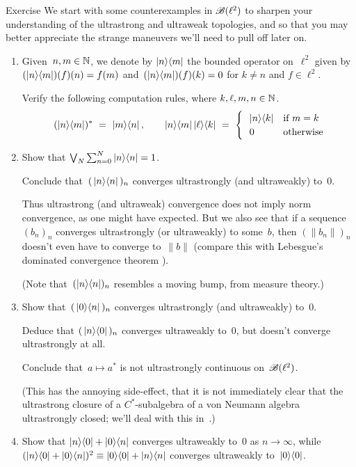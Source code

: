 \documentclass[a]{subfiles}
\begin{document}
\begin{parsec}%
\begin{point}{Exercise}%
We start with some counterexamples in $\mathscr{B}(\ell^2)$
to sharpen your understanding of the ultrastrong and ultraweak topologies,
and so that you may better appreciate
the strange maneuvers we'll need to pull off later on.
\begin{enumerate}
\item
Given~$n,m\in \mathbb{N}$,
we denote by $\left|n\right>\!\left<m\right|$
the bounded operator on~$\ell^2$
given by $(\left|n\right>\!\left<m\right|)(f)(n)=f(m)$
and~$(\left|n\right>\!\left<m\right|)(f)(k)=0$ for $k\neq n$
and $f\in \ell^2$.

Verify the following computation rules,
where $k,\ell,m,n\in \mathbb{N}$.
\begin{equation*}
(\ketbra{n}{m})^*\ =\ \ketbra{m}{n},
\qquad
\ketbra{n}{m}\ketbra{\ell}{k}\ =\ 
\begin{cases}
\ \ \ketbra{n}{k} & \text{if $m=k$} \\
\ \ 0 & \text{otherwise}
\end{cases}
\end{equation*}
\item
Show that $\bigvee_N \sum_{n=0}^N \left|n\right>\!\left<n\right|=1$.

Conclude that~$(\,\left|n\right>\!\left<n\right|\,)_n$
converges ultrastrongly (and ultraweakly) to~$0$.

Thus ultrastrong (and ultraweak) convergence does not imply norm convergence,
as one might have expected.
But we also see that if a sequence~$(b_n)_n$ converges ultrastrongly
(or ultraweakly) to some~$b$,
then $(\|b_n\|)_n$ doesn't even have to converge to~$\|b\|$
(compare this with Lebesgue's dominated convergence
theorem ).

(Note that~$(\left|n\right>\!\left<n\right|)_n$ resembles a moving bump, from measure theory.)
\item
Show that~$(\,\left|0\right>\!\left<n\right|\,)_n$ converges ultrastrongly 
(and ultraweakly) to~$0$.

Deduce that $(\,\left|n\right>\!\left<0\right|\,)_n$ converges ultraweakly to~$0$,
but doesn't converge ultrastrongly at all.

Conclude that~$a\mapsto a^*$ is not ultrastrongly continuous 
on~$\mathscr{B}(\ell^2)$.

(This has the annoying side-effect,
that it is not immediately clear that the ultrastrong
closure of a $C^*$-subalgebra of a von Neumann algebra
ultrastrongly closed; we'll deal with this in~.)
\item
Show that $\left|n\right>\!\left<0\right|+\left|0\right>\!\left<n\right|$
converges ultraweakly to~$0$ as $n\to \infty$,
while $(\left|n\right>\!\left<0\right|+\left|0\right>\!\left<n\right|)^2\equiv \left|0\right>\!\left<0\right|+\left|n\right>\!\left<n\right|$
converges ultraweakly to~$\left|0\right>\!\left<0\right|$.


\end{enumerate}
\end{point}
\end{parsec}
\end{document}
